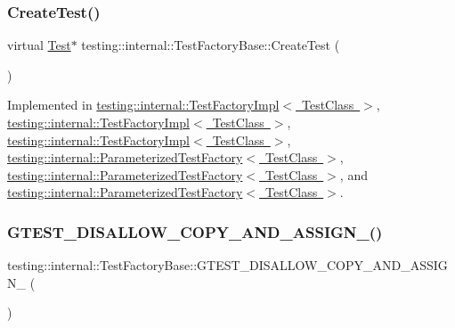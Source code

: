 \subsubsection{\texorpdfstring{CreateTest()}{CreateTest()}\hspace{0.1cm}{\footnotesize\ttfamily [3/3]}}
{\footnotesize\ttfamily virtual \mbox{\hyperlink{classtesting_1_1_test}{Test}}$\ast$ testing\+::internal\+::\+Test\+Factory\+Base\+::\+Create\+Test (\begin{DoxyParamCaption}{ }\end{DoxyParamCaption})\hspace{0.3cm}{\ttfamily [pure virtual]}}



Implemented in \mbox{\hyperlink{classtesting_1_1internal_1_1_test_factory_impl_a8860c89bdb06450a5d5e8137ebd9d775}{testing\+::internal\+::\+Test\+Factory\+Impl$<$ Test\+Class $>$}}, \mbox{\hyperlink{classtesting_1_1internal_1_1_test_factory_impl_ab9b9236ef39b14f0a78e611748e970e3}{testing\+::internal\+::\+Test\+Factory\+Impl$<$ Test\+Class $>$}}, \mbox{\hyperlink{classtesting_1_1internal_1_1_test_factory_impl_ab9b9236ef39b14f0a78e611748e970e3}{testing\+::internal\+::\+Test\+Factory\+Impl$<$ Test\+Class $>$}}, \mbox{\hyperlink{classtesting_1_1internal_1_1_parameterized_test_factory_ae17e73e91f7fd5d49ca238c005ef4960}{testing\+::internal\+::\+Parameterized\+Test\+Factory$<$ Test\+Class $>$}}, \mbox{\hyperlink{classtesting_1_1internal_1_1_parameterized_test_factory_a36d962674d7bf845398637338b9f75cb}{testing\+::internal\+::\+Parameterized\+Test\+Factory$<$ Test\+Class $>$}}, and \mbox{\hyperlink{classtesting_1_1internal_1_1_parameterized_test_factory_a36d962674d7bf845398637338b9f75cb}{testing\+::internal\+::\+Parameterized\+Test\+Factory$<$ Test\+Class $>$}}.

\mbox{\label{classtesting_1_1internal_1_1_test_factory_base_a85d7cb90e00f165e61a008be77293fb4}} 
\subsubsection{\texorpdfstring{GTEST\_DISALLOW\_COPY\_AND\_ASSIGN\_()}{GTEST\_DISALLOW\_COPY\_AND\_ASSIGN\_()}\hspace{0.1cm}{\footnotesize\ttfamily [1/3]}}
{\footnotesize\ttfamily testing\+::internal\+::\+Test\+Factory\+Base\+::\+G\+T\+E\+S\+T\+\_\+\+D\+I\+S\+A\+L\+L\+O\+W\+\_\+\+C\+O\+P\+Y\+\_\+\+A\+N\+D\+\_\+\+A\+S\+S\+I\+G\+N\+\_\+ (\begin{DoxyParamCaption}\item[{\mbox{\hyperlink{classtesting_1_1internal_1_1_test_factory_base}{Test\+Factory\+Base}}}]{ }\end{DoxyParamCaption})\hspace{0.3cm}{\ttfamily [private]}}

